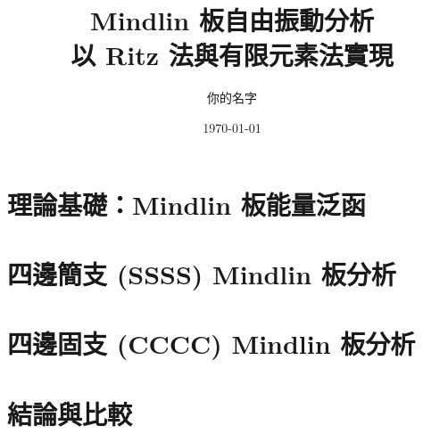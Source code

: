 \documentclass[a4paper,12pt]{ctexart}
\title{
    \textbf{Mindlin 板自由振動分析} \\
    \large 以 Ritz 法與有限元素法實現
}
\author{你的名字}
\date{\today}
\begin{document}
\maketitle
\tableofcontents
\newpage

\section{理論基礎：Mindlin 板能量泛函}


\section{四邊簡支 (SSSS) Mindlin 板分析}


\section{四邊固支 (CCCC) Mindlin 板分析}


\section{結論與比較}


%
%
\end{document}
